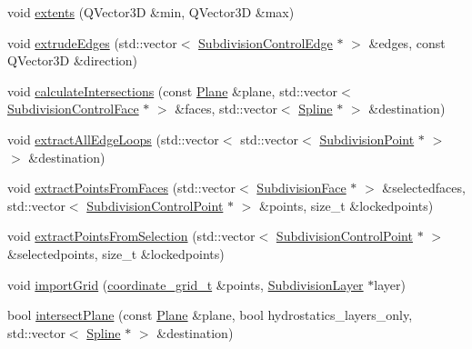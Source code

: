 \begin{DoxyCompactItemize}
void \hyperlink{classShipCADGeometry_1_1SubdivisionSurface_abc1cf0168290242dfbe5dd0d178fa7cb}{extents} (Q\-Vector3\-D \&min, Q\-Vector3\-D \&max)
\item 
void \hyperlink{classShipCADGeometry_1_1SubdivisionSurface_ac19570e1402deab738d2231d6bec9650}{extrude\-Edges} (std\-::vector$<$ \hyperlink{classShipCADGeometry_1_1SubdivisionControlEdge}{Subdivision\-Control\-Edge} $\ast$ $>$ \&edges, const Q\-Vector3\-D \&direction)
\item 
void \hyperlink{classShipCADGeometry_1_1SubdivisionSurface_a576a4d43e01ca50782ba724f63f1b2bd}{calculate\-Intersections} (const \hyperlink{classShipCADGeometry_1_1Plane}{Plane} \&plane, std\-::vector$<$ \hyperlink{classShipCADGeometry_1_1SubdivisionControlFace}{Subdivision\-Control\-Face} $\ast$ $>$ \&faces, std\-::vector$<$ \hyperlink{classShipCADGeometry_1_1Spline}{Spline} $\ast$ $>$ \&destination)
\item 
void \hyperlink{classShipCADGeometry_1_1SubdivisionSurface_a17dccf4965b49427d345bd5acce897c5}{extract\-All\-Edge\-Loops} (std\-::vector$<$ std\-::vector$<$ \hyperlink{classShipCADGeometry_1_1SubdivisionPoint}{Subdivision\-Point} $\ast$ $>$ $>$ \&destination)
\item 
void \hyperlink{classShipCADGeometry_1_1SubdivisionSurface_af62ba549d058dfddd4bfa1b69a577220}{extract\-Points\-From\-Faces} (std\-::vector$<$ \hyperlink{classShipCADGeometry_1_1SubdivisionFace}{Subdivision\-Face} $\ast$ $>$ \&selectedfaces, std\-::vector$<$ \hyperlink{classShipCADGeometry_1_1SubdivisionControlPoint}{Subdivision\-Control\-Point} $\ast$ $>$ \&points, size\-\_\-t \&lockedpoints)
\item 
void \hyperlink{classShipCADGeometry_1_1SubdivisionSurface_af0f0d7bb979c8c8ba04b9be26e7cfe30}{extract\-Points\-From\-Selection} (std\-::vector$<$ \hyperlink{classShipCADGeometry_1_1SubdivisionControlPoint}{Subdivision\-Control\-Point} $\ast$ $>$ \&selectedpoints, size\-\_\-t \&lockedpoints)
\item 
void \hyperlink{classShipCADGeometry_1_1SubdivisionSurface_aa193fd28425e9846908479615e7c5bf9}{import\-Grid} (\hyperlink{classShipCADGeometry_1_1SubdivisionSurface_a89a36532eb6c7c2022258f8605fe929c}{coordinate\-\_\-grid\-\_\-t} \&points, \hyperlink{classShipCADGeometry_1_1SubdivisionLayer}{Subdivision\-Layer} $\ast$layer)
\item 
bool \hyperlink{classShipCADGeometry_1_1SubdivisionSurface_ab7191008f7ec3ef34b578b27e4340927}{intersect\-Plane} (const \hyperlink{classShipCADGeometry_1_1Plane}{Plane} \&plane, bool hydrostatics\-\_\-layers\-\_\-only, std\-::vector$<$ \hyperlink{classShipCADGeometry_1_1Spline}{Spline} $\ast$ $>$ \&destination)

\end{DoxyCompactItemize}
